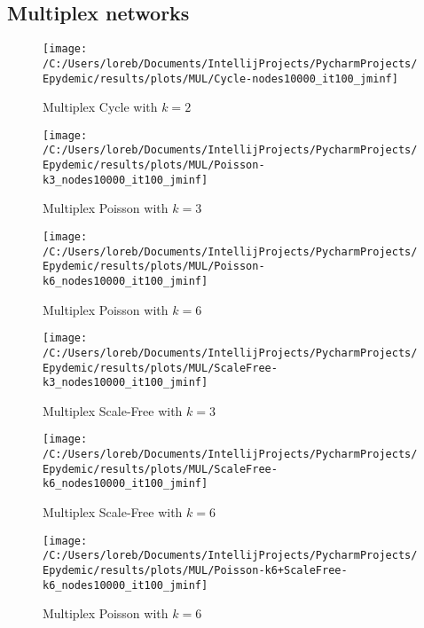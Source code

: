 \subsection{Multiplex networks}\label{subsec:app-multiplex-networks}
    \begin{figure}[H]
        \texttt{[image: /C:/Users/loreb/Documents/IntellijProjects/PycharmProjects/Epydemic/results/plots/MUL/Cycle-nodes10000\_it100\_jminf]}\caption{Multiplex Cycle with $k=2$}
        \label{fig:multi_cycle}
    \end{figure}
    \begin{figure}[H]
        \texttt{[image: /C:/Users/loreb/Documents/IntellijProjects/PycharmProjects/Epydemic/results/plots/MUL/Poisson-k3\_nodes10000\_it100\_jminf]}\caption{Multiplex Poisson with $k=3$}
        \label{fig:multi_poisson_k_3}
    \end{figure}
    \begin{figure}[H]
        \texttt{[image: /C:/Users/loreb/Documents/IntellijProjects/PycharmProjects/Epydemic/results/plots/MUL/Poisson-k6\_nodes10000\_it100\_jminf]}\caption{Multiplex Poisson with $k=6$}
        \label{fig:multi_poisson_k_6}
    \end{figure}
    \begin{figure}[H]
        \texttt{[image: /C:/Users/loreb/Documents/IntellijProjects/PycharmProjects/Epydemic/results/plots/MUL/ScaleFree-k3\_nodes10000\_it100\_jminf]}\caption{Multiplex Scale-Free with $k=3$}
        \label{fig:multi_scale_free_k_3}
    \end{figure}
    \begin{figure}[H]
        \texttt{[image: /C:/Users/loreb/Documents/IntellijProjects/PycharmProjects/Epydemic/results/plots/MUL/ScaleFree-k6\_nodes10000\_it100\_jminf]}\caption{Multiplex Scale-Free with $k=6$}
        \label{fig:multi_scale_free_k_6}
    \end{figure}
    \begin{figure}[H]
        \texttt{[image: /C:/Users/loreb/Documents/IntellijProjects/PycharmProjects/Epydemic/results/plots/MUL/Poisson-k6+ScaleFree-k6\_nodes10000\_it100\_jminf]}\caption{Multiplex Poisson with $k=6$}
        \label{fig:multi_poisson_k_6_5}
    \end{figure}

